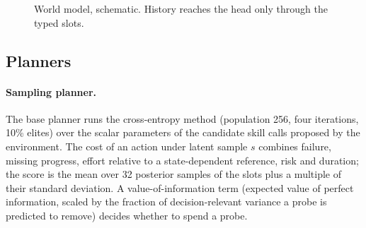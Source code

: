 \begin{figure}[!htbp]
  \centering
  \caption{World model, schematic. History reaches the head only through the typed slots.
  }
  \label{fig:arch}
\end{figure}

\subsection{Planners}
\label{sec:planner}

\paragraph{Sampling planner.} The base planner runs the cross-entropy method \citep{rubinstein1999cross}
(population 256, four iterations, 10\% elites) over the scalar parameters of the candidate skill calls proposed
by the environment. The cost of an action under latent sample $s$ combines failure, missing progress, effort
relative to a state-dependent reference, risk and duration; the score is the mean over 32 posterior samples of
the slots plus a multiple of their standard deviation. A value-of-information term (expected value of perfect
information, scaled by the fraction of decision-relevant variance a probe is predicted to remove) decides
whether to spend a probe.

